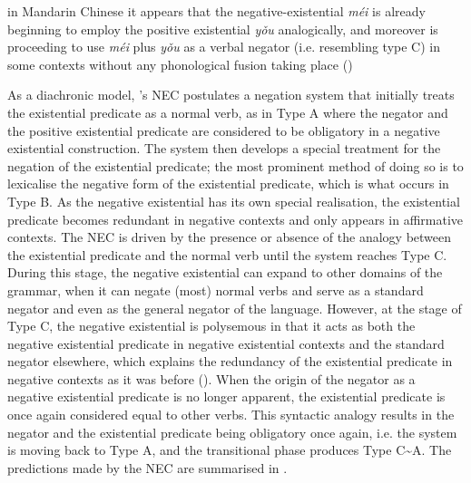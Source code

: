 \documentclass[output=paper,colorlinks,citecolor=brown,chinesefont]{langscibook}
\begin{document}
\begin{displayquote}
in Mandarin Chinese it appears that the negative-existential \textit{méi} is already beginning to employ the positive existential \textit{yǒu} analogically, and moreover is proceeding to use \textit{méi} plus \textit{yǒu} as a verbal negator (i.e. resembling type C) in some contexts without any phonological fusion taking place (\citealt[23]{Croft1991})
\end{displayquote}


As a diachronic model, \citeauthor{Croft1991}'s NEC postulates a negation system that initially treats the existential predicate as a normal verb, as in Type A where the negator and the positive existential predicate are considered to be obligatory in a negative existential construction. The system then develops a special treatment for the negation of the existential predicate; the most prominent method of doing so is to lexicalise the negative form of the existential predicate, which is what occurs in Type B. As the negative existential has its own special realisation, the existential predicate becomes redundant in negative contexts and only appears in affirmative contexts. The NEC is driven by the presence or absence of the analogy between the existential predicate and the normal verb until the system reaches Type C. During this stage, the negative existential can expand to other domains of the grammar, when it can negate (most) normal verbs and serve as a standard negator and even as the general negator of the language. However, at the stage of Type C, the negative existential is polysemous in that it acts as both the negative existential predicate in negative existential contexts and the standard negator elsewhere, which explains the redundancy of the existential predicate in negative contexts as it was before (\citealt[12]{Croft1991}). When the origin of the negator as a negative existential predicate is no longer apparent, the existential predicate is once again considered equal to other verbs. This syntactic analogy results in the negator and the existential predicate being obligatory once again, i.e. the system is moving back to Type A, and the transitional phase produces Type C\sim A. The predictions made by the NEC are summarised in .
\end{document}
